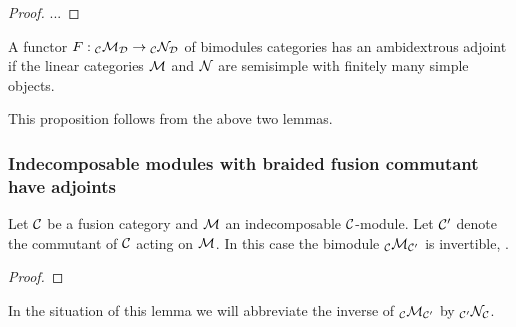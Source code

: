 \documentclass{amsart}
\begin{document}
\begin{proof}
...
\end{proof}

\begin{proposition} \label{prop-functadj}
A functor $F: {}_{\mathcal C} {\mathcal M}_{\mathcal D} \rightarrow {}_{\mathcal C} {\mathcal N}_{\mathcal D}$ of bimodules categories has an ambidextrous adjoint if the linear categories $\mathcal M$ and $\mathcal N$ are semisimple with finitely many simple objects.
\end{proposition}

This proposition follows from the above two lemmas.


\subsubsection{Indecomposable modules with braided fusion commutant have adjoints} \label{sec-df-modules}


\begin{lemma} \label{lemma-invertible}
Let $\mathcal C$ be a fusion category and $\mathcal M$ an indecomposable $\mathcal C$-module.  Let $\mathcal C'$ denote the commutant of $\mathcal C$ acting on $\mathcal M$.  In this case the bimodule ${}_{\mathcal C} {\mathcal M}_{\mathcal C'}$ is invertible, .
\end{lemma}

\begin{proof}


\end{proof}

In the situation of this lemma we will abbreviate the inverse  of ${}_{\mathcal C} {\mathcal M}_{\mathcal C'}$ by ${}_{\mathcal C'} {\mathcal N}_{\mathcal C}$.
\end{document}
